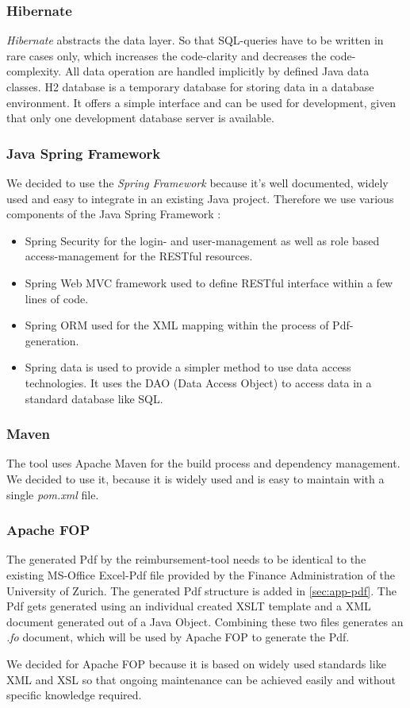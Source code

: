 \subsubsection{Hibernate}
\textit{Hibernate} abstracts the data layer. So that SQL-queries have to be written in rare cases only, which increases the code-clarity and decreases the code-complexity. All data operation are handled implicitly by defined Java data classes.\newline
H2 database is a temporary database for storing data in a database environment. It offers a simple interface and can be used for development, given that only one development database server is available. \cite{hibernate}

\subsubsection{Java Spring Framework}
We decided to use the \textit{Spring Framework} because it's well documented, widely used and easy to integrate in an existing Java project. Therefore we use various components of the Java Spring Framework \cite{spring}:
\begin{itemize}
    \item Spring Security for the login- and user-management as well as role based access-management for the RESTful resources.
    \item Spring Web MVC framework used to define RESTful interface within a few lines of code.
    \item Spring ORM used for the XML mapping within the process of Pdf-generation.
    \item Spring data is used to provide a simpler method to use data access technologies. It uses the DAO (Data Access Object) \cite{dao} to access data in a standard database like SQL.
\end{itemize}

\subsubsection{Maven}
The tool uses Apache Maven \cite{maven} for the build process and dependency management. We decided to use it, because it is widely used and is easy to maintain with a single \textit{pom.xml} file.

\subsubsection{Apache FOP}
The generated Pdf by the reimbursement-tool needs to be identical to the existing MS-Office Excel-Pdf file provided by the Finance Administration of the University of Zurich. The generated Pdf structure is added in \ref{sec:app-pdf}.\newline
The Pdf gets generated using an individual created XSLT template and a XML document generated out of a Java Object. Combining these two files generates an \textit{.fo} document, which will be used by Apache FOP \cite{apache-fop} to generate the Pdf.\par
We decided for Apache FOP because it is based on widely used standards like XML and XSL so that ongoing maintenance can be achieved easily and without specific knowledge required.

